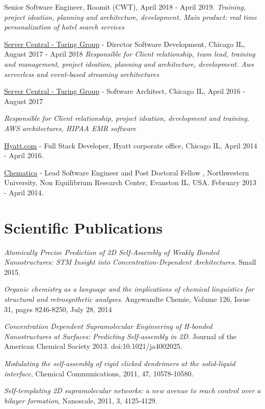 \documentclass[11pt,letterpaper]{article}
\renewenvironment{itemize}{
  \begin{list}{}{
    \setlength{\leftmargin}{1.5em}
  }
}{
  \end{list}
}
\begin{document}
\begin{itemize}
% 
\item Senior Software Engineer, Roomit (CWT),  April 2018 - April 2019. 
\textit{Training, project ideation, planning and architecture, development. Main product: real time personalization of hotel search services}

\item \href{http://www.turinggroup.com}{Server Central - Turing Group} - Director Software Development,  Chicago  IL, August 2017 - April 2018 
\textit{Responsible for Client relationship, team lead, training and management, project ideation, planning and architecture, development. Aws serverless and event-based streaming architectures}

\item \href{http://www.turinggroup.com}{Server Central - Turing Group} - Software Architect,  Chicago  IL, April 2016 - August 2017 

\textit{Responsible for Client relationship, project ideation, development and training.  AWS architectures, HIPAA EMR software}
\item \href{http://www.hyatt.com}{Hyatt.com} -  Full Stack Developer, Hyatt corporate office,  Chicago  IL, April 2014 - April 2016. 
\item \href{http://www.chematica.net}{Chematica} - Lead Software Engineer and Post Doctoral Fellow , Northwestern University, Non Equilibrium Research Center, Evanston IL, USA. February 2013 - April 2014.

% 
\end{itemize}
\section*{Scientific Publications}
\begin {itemize}
\item       \textit{Atomically Precise Prediction of 2D Self-Assembly of Weakly Bonded Nanostructures: STM Insight into Concentration-Dependent Architectures}. Small 2015.
\item       \textit{Organic chemistry as a language and the implications of chemical linguistics for structural and retrosynthetic analyses}. Angewandte Chemie, Volume 126, Issue 31, pages 8246-8250, July 28, 2014
\item 	    \textit{Concentration Dependent Supramolecular Engineering of H-bonded Nanostructures at Surfaces: Predicting Self-assembly in 2D}. Journal of the American Chemical Society 2013. doi:10.1021/ja4002025.
\item  \textit{Modulating the self-assembly of rigid clicked dendrimers at the solid-liquid interface}, Chemical Communications, 2011, 47, 10578-10580.
\item  \textit{
Self-templating 2D supramolecular networks: a new avenue to reach control over a bilayer formation}, Nanoscale, 2011, 3, 4125-4129.
\end{itemize}
\end{document}
